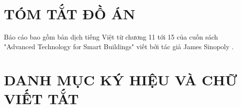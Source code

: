 \documentclass{thesis}
\begin{document}
\newpage %

\section*{TÓM TẮT ĐỒ ÁN}
\thispagestyle{empty}

Báo cáo bao gồm bản dịch tiếng Việt từ chương 11 tới 15 của cuốn sách "Advanced
Technology for Smart Buildings" viết bởi tác giả James Sinopoly
\cite{sinopoli2016advanced}.

\thispagestyle{empty}
\cleardoublepage

\tableofcontents
\thispagestyle{empty}
\newpage

\section*{DANH MỤC KÝ HIỆU VÀ CHỮ VIẾT TẮT}
 {}
\end{document}
